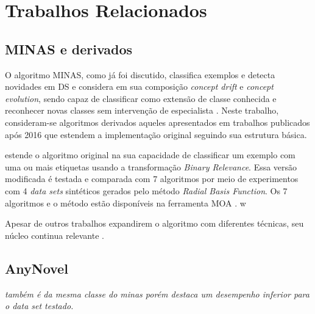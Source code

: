 \chapter{Trabalhos Relacionados}
\label{cha:related}



\section{MINAS e derivados}

O algoritmo MINAS, como já foi discutido, classifica exemplos e detecta
novidades em DS e considera em sua composição \emph{concept drift} e
\emph{concept evolution}, sendo capaz de classificar como extensão de classe
conhecida e reconhecer novas classes sem intervenção de especialista
\cite{Faria2016minas}. Neste trabalho, consideram-se algoritmos derivados
aqueles apresentados em trabalhos publicados após 2016 que estendem a
implementação original seguindo sua estrutura básica.




 estende o algoritmo original na sua capacidade de
classificar um exemplo com uma ou mais etiquetas usando a transformação
\emph{Binary Relevance}. Essa versão modificada é testada e comparada com 7
algoritmos por meio de experimentos com 4 \emph{data sets} sintéticos gerados
pelo método \emph{Radial Basis Function}. Os 7 algoritmos e o método estão
disponíveis na ferramenta MOA \cite{MOA}.
w

Apesar de outros trabalhos expandirem o algoritmo com diferentes técnicas, seu
núcleo continua relevante \cite{DaSilva2018,DaSilva2018thesis,Costa2019}.

\section{AnyNovel}

\textit{também é da mesma classe do minas porém  destaca um
desempenho inferior para o \emph{data set} testado.}

